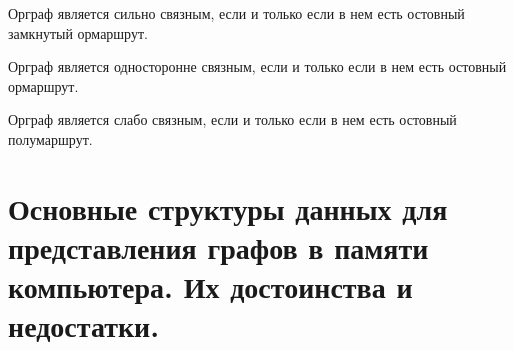 \begin{theorem}
    Орграф является сильно связным, если и только если в нем есть остовный замкнутый ормаршрут.
\end{theorem}

\begin{theorem}
    Орграф является односторонне связным, если и только если в нем есть остовный ормаршрут.
\end{theorem}

\begin{theorem}
    Орграф является слабо связным, если и только если в нем есть остовный полумаршрут.
\end{theorem}

\section{Основные структуры данных для представления графов в памяти компьютера. Их достоинства и недостатки.}

